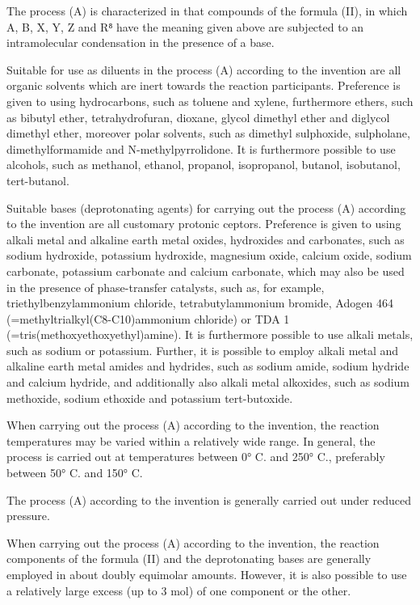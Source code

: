 \documentclass[11pt,a4paper]{article}
\begin{document}
The process (A) is characterized in that compounds of the formula (II), in which A, B, X, Y, Z and R⁸ have the meaning given above are subjected to an intramolecular condensation in the presence of a base.

Suitable for use as diluents in the process (A) according to the invention are all organic solvents which are inert towards the reaction participants. Preference is given to using hydrocarbons, such as toluene and xylene, furthermore ethers, such as bibutyl ether, tetrahydrofuran, dioxane, glycol dimethyl ether and diglycol dimethyl ether, moreover polar solvents, such as dimethyl sulphoxide, sulpholane, dimethylformamide and N-methylpyrrolidone. It is furthermore possible to use alcohols, such as methanol, ethanol, propanol, isopropanol, butanol, isobutanol, tert-butanol.

Suitable bases (deprotonating agents) for carrying out the process (A) according to the invention are all customary protonic ceptors. Preference is given to using alkali metal and alkaline earth metal oxides, hydroxides and carbonates, such as sodium hydroxide, potassium hydroxide, magnesium oxide, calcium oxide, sodium carbonate, potassium carbonate and calcium carbonate, which may also be used in the presence of phase-transfer catalysts, such as, for example, triethylbenzylammonium chloride, tetrabutylammonium bromide, Adogen 464 (=methyltrialkyl(C8-C10)ammonium chloride) or TDA 1 (=tris(methoxyethoxyethyl)amine). It is furthermore possible to use alkali metals, such as sodium or potassium. Further, it is possible to employ alkali metal and alkaline earth metal amides and hydrides, such as sodium amide, sodium hydride and calcium hydride, and additionally also alkali metal alkoxides, such as sodium methoxide, sodium ethoxide and potassium tert-butoxide.

When carrying out the process (A) according to the invention, the reaction temperatures may be varied within a relatively wide range. In general, the process is carried out at temperatures between 0° C. and 250° C., preferably between 50° C. and 150° C.

The process (A) according to the invention is generally carried out under reduced pressure.

When carrying out the process (A) according to the invention, the reaction components of the formula (II) and the deprotonating bases are generally employed in about doubly equimolar amounts. However, it is also possible to use a relatively large excess (up to 3 mol) of one component or the other.
\end{document}
